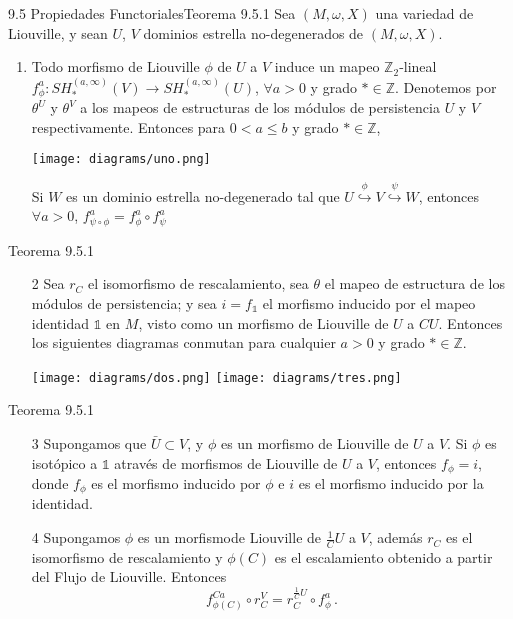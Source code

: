 \documentclass{beamer}
\begin{document}
\begin{frame}{9.5 Propiedades Functoriales}{Teorema 9.5.1}
Sea $(M,\omega,X)$ una variedad de Liouville, y sean $U$, $V$ dominios estrella no-degenerados de $(M,\omega,X)$.
\begin{enumerate}
\item Todo morfismo de Liouville $\phi$ de $U$ a $V$ induce un mapeo $\mathbb{Z}_{2}$-lineal $f_{\phi}^{a}:SH_{\ast}^{(a,\infty)}(V)\rightarrow SH_{\ast}^{(a,\infty)}(U)$, $\forall a>0$ y grado $\ast\in \mathbb{Z}$. Denotemos por $\theta^{U}$ y $\theta^{V}$ a los mapeos de estructuras de los m\'odulos de persistencia $U$ y $V$ respectivamente. Entonces para $0<a\leq b$ y grado $\ast \in \mathbb{Z}$,
\begin{center}
\texttt{[image: diagrams/uno.png]}
\end{center}
Si $W$ es un dominio estrella no-degenerado tal que $U \overset{\phi}{\hookrightarrow} V \overset{\psi}{\hookrightarrow} W$, entonces $\forall a>0$, $f_{\psi \circ \phi}^{a}=f_{\phi}^{a}\circ f_{\psi}^{a}$ \scalebox{0.7}{(Ejemplo 9.5.4).}
\end{enumerate}
\end{frame}

\begin{frame}{}{Teorema 9.5.1}
\begin{enumerate}
\item[2] Sea $r_{C}$ el isomorfismo de rescalamiento, sea $\theta$ el mapeo de estructura de los m\'odulos de persistencia; y sea $i=f_{\mathbb{1}}$ el morfismo inducido por el mapeo identidad $\mathbb{1}$ en $M$, visto como un morfismo de Liouville de $U$ a $CU$. Entonces los siguientes diagramas conmutan para cualquier $a>0$ y grado $\ast \in \mathbb{Z}$.
\begin{center}
\texttt{[image: diagrams/dos.png]}
\texttt{[image: diagrams/tres.png]}
\end{center}
\end{enumerate}
\end{frame}

\begin{frame}{}{Teorema 9.5.1}
\begin{enumerate}
\item[3] Supongamos que $\bar{U}\subset V$, y $\phi$ es un morfismo de Liouville de $U$ a $V$. Si $\phi$ es isot\'opico a $\mathbb{1}$ atrav\'es de  morfismos de Liouville de $U$ a $V$, entonces $f_{\phi}=i$, donde $f_{\phi}$ es el morfismo inducido por $\phi$ e $i$ es el morfismo inducido por la identidad.

\item[4] Supongamos $\phi$ es un morfismode Liouville de $\frac{1}{C}U$ a $V$, adem\'as $r_{C}$ es el isomorfismo de rescalamiento y $\phi(C)$ es el escalamiento obtenido a partir del Flujo de Liouville. Entonces
$$f_{\phi(C)}^{Ca}\circ r_{C}^{V}=r_{C}^{\frac{1}{C}U}\circ f_{\phi}^{a}\,.$$

\end{enumerate}
\end{frame}
\end{document}
